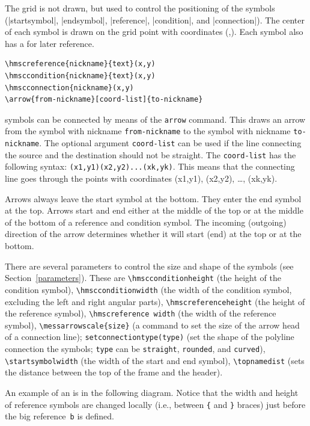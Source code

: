 \documentclass[12pt,a4paper]{article}
\begin{document}
The \HMSC{} grid is not drawn, but used to control the positioning of the
\HMSC{} symbols  (|startsymbol|, |endsymbol|, |reference|,
|condition|, and |connection|). 
The center of each symbol is drawn on the grid point
with coordinates (,). Each symbol also has a 
for later reference.

\begin{verbatim}
\hmscreference{nickname}{text}(x,y)
\hmsccondition{nickname}{text}(x,y)
\hmscconnection{nickname}(x,y)
\arrow{from-nickname}[coord-list]{to-nickname}
\end{verbatim}

\HMSC{} symbols can be connected by means of the \verb+arrow+ command.
This draws an arrow from the symbol with nickname \verb+from-nickname+
to the symbol with nickname \verb+to-nickname+. The optional argument
\verb+coord-list+ can be used if the line connecting the source and
the destination should not be straight. The \verb+coord-list+ has
the following syntax: \verb+(x1,y1)(x2,y2)...(xk,yk)+. This means
that the connecting line goes through the points with coordinates
(x1,y1), (x2,y2), \ldots, (xk,yk).

Arrows always leave the start symbol at the bottom. They enter the end symbol
at the top.
Arrows start and end either at the middle of the top or at the middle
of the bottom of a reference and condition symbol. The incoming
(outgoing) direction of the arrow determines whether it will start
(end) at the top or at the bottom.

There are several parameters to control the size and shape of the
symbols (see Section~\ref{parameters}). These are
\verb+\hmscconditionheight+ (the height of the condition symbol),
\verb+\hmscconditionwidth+ (the width of the condition symbol,
excluding the left and right angular parts),
\verb+\hmscreferenceheight+ (the height of the reference symbol),
\verb+\hmscreference width+ (the width of the reference symbol),
\verb+\messarrowscale{size}+ (a command to set the size of the arrow
head of a connection line);
\verb+setconnectiontype(type)+ (set the shape of the polyline
connection the symbols; \verb+type+ can be \verb+straight+,
\verb+rounded+, and \verb+curved+),
\verb+\startsymbolwidth+ (the width of the start and end symbol),
\verb+\topnamedist+ (sets the distance between the top of the \HMSC{} frame
and the \HMSC{} header).

An example of an \HMSC{} is in the following diagram. Notice that the
width and height of reference symbols are changed locally (i.e.,
between \verb+{+ and \verb+}+ braces) just before the big
reference~\verb+b+ is defined.
\end{document}
